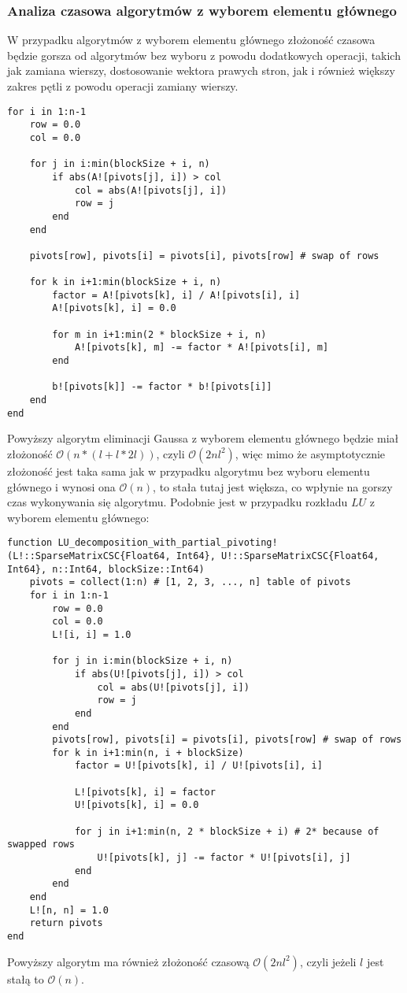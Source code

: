 \documentclass{article}
\begin{document}
\subsubsection{Analiza czasowa algorytmów z wyborem elementu głównego}
W przypadku algorytmów z wyborem elementu głównego złożoność czasowa będzie gorsza od algorytmów bez wyboru z powodu dodatkowych operacji, takich jak zamiana wierszy, dostosowanie wektora prawych stron, jak i również większy zakres pętli z powodu operacji zamiany wierszy.
\newpage
\begin{verbatim}
for i in 1:n-1
    row = 0.0
    col = 0.0

    for j in i:min(blockSize + i, n)
        if abs(A![pivots[j], i]) > col
            col = abs(A![pivots[j], i])
            row = j
        end
    end

    pivots[row], pivots[i] = pivots[i], pivots[row] # swap of rows

    for k in i+1:min(blockSize + i, n)
        factor = A![pivots[k], i] / A![pivots[i], i]
        A![pivots[k], i] = 0.0

        for m in i+1:min(2 * blockSize + i, n)
            A![pivots[k], m] -= factor * A![pivots[i], m]
        end

        b![pivots[k]] -= factor * b![pivots[i]]
    end
end
\end{verbatim}
Powyższy algorytm eliminacji Gaussa z wyborem elementu głównego będzie miał złożoność $\mathcal{O}(n * (l + l * 2l))$, czyli $\mathcal{O}(2nl^2)$, więc mimo że asymptotycznie złożoność jest taka sama jak w przypadku algorytmu bez wyboru elementu głównego i wynosi ona $\mathcal{O}(n)$, to stała tutaj jest większa, co wpłynie na gorszy czas wykonywania się algorytmu. Podobnie jest w przypadku rozkładu $LU$ z wyborem elementu głównego:
\begin{verbatim}
function LU_decomposition_with_partial_pivoting!(L!::SparseMatrixCSC{Float64, Int64}, U!::SparseMatrixCSC{Float64, Int64}, n::Int64, blockSize::Int64) 
    pivots = collect(1:n) # [1, 2, 3, ..., n] table of pivots
    for i in 1:n-1
        row = 0.0
        col = 0.0
        L![i, i] = 1.0

        for j in i:min(blockSize + i, n)
            if abs(U![pivots[j], i]) > col
                col = abs(U![pivots[j], i])
                row = j
            end
        end
        pivots[row], pivots[i] = pivots[i], pivots[row] # swap of rows
        for k in i+1:min(n, i + blockSize)
            factor = U![pivots[k], i] / U![pivots[i], i]

            L![pivots[k], i] = factor
            U![pivots[k], i] = 0.0

            for j in i+1:min(n, 2 * blockSize + i) # 2* because of swapped rows
                U![pivots[k], j] -= factor * U![pivots[i], j]
            end
        end 
    end
    L![n, n] = 1.0
    return pivots
end
\end{verbatim}
Powyższy algorytm ma również złożoność czasową $\mathcal{O}(2nl^2)$, czyli jeżeli $l$ jest stałą to  $\mathcal{O}(n)$.
\end{document}
